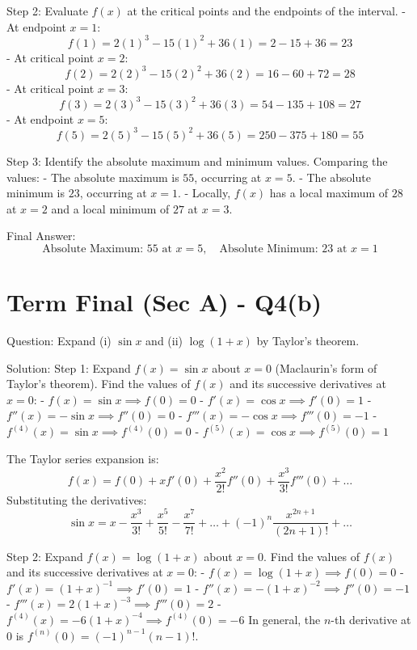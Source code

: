 \documentclass[11pt, a4paper]{article}
\begin{document}
Step 2: Evaluate $f(x)$ at the critical points and the endpoints of the interval.
- At endpoint $x = 1$:
  $$f(1) = 2(1)^3 - 15(1)^2 + 36(1) = 2 - 15 + 36 = 23$$
- At critical point $x = 2$:
  $$f(2) = 2(2)^3 - 15(2)^2 + 36(2) = 16 - 60 + 72 = 28$$
- At critical point $x = 3$:
  $$f(3) = 2(3)^3 - 15(3)^2 + 36(3) = 54 - 135 + 108 = 27$$
- At endpoint $x = 5$:
  $$f(5) = 2(5)^3 - 15(5)^2 + 36(5) = 250 - 375 + 180 = 55$$

Step 3: Identify the absolute maximum and minimum values.
Comparing the values:
- The absolute maximum is $55$, occurring at $x = 5$.
- The absolute minimum is $23$, occurring at $x = 1$.
- Locally, $f(x)$ has a local maximum of $28$ at $x = 2$ and a local minimum of $27$ at $x = 3$.

Final Answer:
$$
\boxed{\text{Absolute Maximum: } 55 \text{ at } x = 5, \quad \text{Absolute Minimum: } 23 \text{ at } x = 1}
$$


\section*{Term Final (Sec A) - Q4(b)}
Question:
Expand (i) $\sin x$ and (ii) $\log(1+x)$ by Taylor's theorem.

Solution:
Step 1: Expand $f(x) = \sin x$ about $x = 0$ (Maclaurin's form of Taylor's theorem).
Find the values of $f(x)$ and its successive derivatives at $x = 0$:
- $f(x) = \sin x \implies f(0) = 0$
- $f'(x) = \cos x \implies f'(0) = 1$
- $f''(x) = -\sin x \implies f''(0) = 0$
- $f'''(x) = -\cos x \implies f'''(0) = -1$
- $f^{(4)}(x) = \sin x \implies f^{(4)}(0) = 0$
- $f^{(5)}(x) = \cos x \implies f^{(5)}(0) = 1$

The Taylor series expansion is:
$$f(x) = f(0) + x f'(0) + \frac{x^2}{2!} f''(0) + \frac{x^3}{3!} f'''(0) + \dots$$
Substituting the derivatives:
$$\sin x = x - \frac{x^3}{3!} + \frac{x^5}{5!} - \frac{x^7}{7!} + \dots + (-1)^n \frac{x^{2n+1}}{(2n+1)!} + \dots$$

Step 2: Expand $f(x) = \log(1+x)$ about $x = 0$.
Find the values of $f(x)$ and its successive derivatives at $x = 0$:
- $f(x) = \log(1+x) \implies f(0) = 0$
- $f'(x) = (1+x)^{-1} \implies f'(0) = 1$
- $f''(x) = -(1+x)^{-2} \implies f''(0) = -1$
- $f'''(x) = 2(1+x)^{-3} \implies f'''(0) = 2$
- $f^{(4)}(x) = -6(1+x)^{-4} \implies f^{(4)}(0) = -6$
In general, the $n$-th derivative at $0$ is $f^{(n)}(0) = (-1)^{n-1}(n-1)!$.
\end{document}
